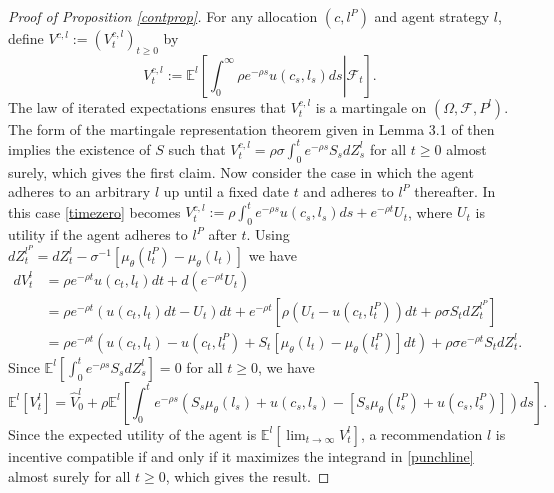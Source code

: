 \documentclass[11pt]{article}
\theoremstyle{plain}
\begin{document}
\begin{proof}[Proof of Proposition \ref{contprop}]
For any allocation $(c,l^P)$ and agent strategy $l$, define $V^{c,l} := (V^{c,l}_t)_{t\geq0}$ by
\begin{equation}
V_t^{c,l} := \mathbb{E}^l{\left[\left. \int_{0}^{\infty}\rho e^{-\rho s}u(c_s,l_s) ds \right| \mathcal{F}_t\right]}.
\label{timezero}
\end{equation} %
The law of iterated expectations ensures that $V_t^{c,l}$ is a martingale on $(\Omega, \mathcal{F}, P^l)$. The form of the martingale representation theorem given in Lemma 3.1 of \cite{cvitanic_optimal_2009} then implies the existence of $S$ such that $V_t^{c,l} = \rho \sigma \int_{0}^{t} e^{-\rho s} S_sdZ^l_s$ for all $t \geq 0$ almost surely, which gives the first claim. Now consider the case in which the agent adheres to an arbitrary $l$ up until a fixed date $t$ and adheres to $l^P$ thereafter. In this case \eqref{timezero} becomes $V^{c,l}_t := \rho \int_{0}^{t} e^{-\rho s} u(c_s,l_s)ds + e^{-\rho t} U_t$, where $U_t$ is utility if the agent adheres to $l^P$ after $t$. Using $dZ^{l^P}_t = dZ^l_t - \sigma^{-1}[\mu_{\theta}(l^P_{t}) - \mu_{\theta}(l_{t})]$ we have %
\begin{align*}
dV^l_t & = \rho e^{-\rho t} u(c_t,l_t)dt +  d{\left(e^{-\rho t} U_t\right)}
\\ & = \rho e^{-\rho t} (u(c_t,l_t)dt - U_t)dt + e^{-\rho t} {\left[ \rho(U_t - u(c_t, l_t^P))dt +  \rho\sigma S_tdZ^{l^P}_t\right]}
\\ & = \rho e^{-\rho t}{\left(u(c_t,l_t) - u(c_t, l_t^P) + S_t [\mu_{\theta}(l_t)-\mu_{\theta}(l^P_t)] dt\right)} + \rho \sigma e^{-\rho t} S_tdZ^l_t. %
\end{align*}
Since $\mathbb{E}^l{\left[ \int_{0}^{t} e^{-\rho s} S_sdZ^l_s \right]} = 0$ for all $t \geq 0$, we have 
\begin{equation}
\mathbb{E}^l[V^l_t] = \hat{V}^l_0 + \rho \mathbb{E}^l{\left[\int_{0}^{t}e^{-\rho s} {\left(S_s\mu_{\theta}(l_s) + u(c_s, l_s) - [S_s\mu_{\theta}(l^P_s) + u(c_s, l^P_s)]\right)}ds \right]}.
\label{punchline}
\end{equation}
Since the expected utility of the agent is $\mathbb{E}^l[ \lim_{t \rightarrow \infty} V^l_t]$, a recommendation $l$ is incentive compatible if and only if it maximizes the integrand in \eqref{punchline} almost surely for all $t \geq 0$, which gives the result. 
\end{proof}
\end{document}
